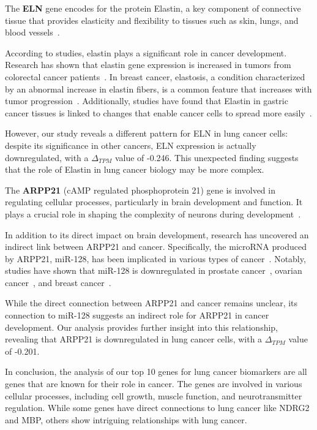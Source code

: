 The \textbf{ELN} gene encodes for the protein Elastin,
a key component of connective tissue that provides elasticity and
flexibility to tissues such as skin, lungs, and blood vessels~\cite{Debelle1999ELN}.

According to studies, elastin plays a significant role in cancer development.
Research has shown that elastin gene expression is increased in tumors from colorectal cancer patients~\cite{Li2020ELN}.
In breast cancer, elastosis, a condition characterized by an abnormal increase in elastin fibers,
is a common feature that increases with tumor progression~\cite{Lepucki2022ELN}.
Additionally, studies have found that Elastin in gastric cancer tissues is linked to changes that enable cancer cells
to spread more easily~\cite{Fang2023ELN}.

However, our study reveals a different pattern for ELN in lung cancer cells:
despite its significance in other cancers, ELN expression is actually downregulated, with a $\Delta_{TPM}$ value of -0.246.
This unexpected finding suggests that the role of Elastin in lung cancer biology may be more complex.
\newline

The \textbf{ARPP21} (cAMP regulated phosphoprotein 21) gene is involved in regulating cellular processes,
particularly in brain development and function.
It plays a crucial role in shaping the complexity of neurons during development~\cite{Rehfeld2018ARPP21}.

In addition to its direct impact on brain development, research has uncovered an indirect link between ARPP21 and cancer.
Specifically, the microRNA produced by ARPP21, miR-128, has been implicated in various types of cancer~\cite{Li2013ARPP21}.
Notably, studies have shown that miR-128 is downregulated in prostate cancer~\cite{Khan2010ARPP21}, ovarian cancer~\cite{Woo2012ARPP21},
and breast cancer~\cite{Zhu2011ARPP21}.

While the direct connection between ARPP21 and cancer remains unclear,
its connection to miR-128 suggests an indirect role for ARPP21 in cancer development.
Our analysis provides further insight into this relationship, revealing that ARPP21 is downregulated in lung cancer cells,
with a $\Delta_{TPM}$ value of -0.201.
\newline

In conclusion, the analysis of our top 10 genes for lung cancer biomarkers are all genes that are known for their role in cancer.
The genes are involved in various cellular processes, including cell growth, muscle function, and neurotransmitter regulation.
While some genes have direct connections to lung cancer like NDRG2 and MBP,
others show intriguing relationships with lung cancer.

